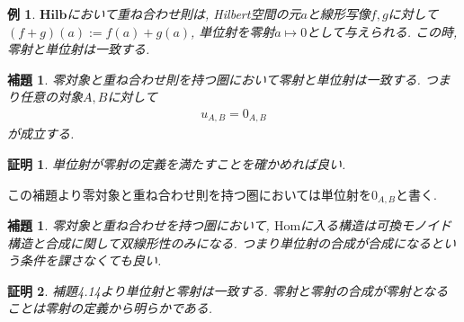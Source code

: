 \documentclass[a4paper,12pt]{ltjsarticle}
\theoremstyle{break}
\newtheorem{lem}[thm]{補題}
\newtheorem{eg}[thm]{例}
\newtheorem*{prf}{証明}
\newcommand{\hilb}{\mathbf{Hilb}}
\newcommand{\Hom}{\mathrm{Hom}}
\newcommand{\mt}{\mapsto}
\numberwithin{equation}{section}
\begin{document}
\begin{eg}
  $\hilb$において重ね合わせ則は, Hilbert空間の元$a$と線形写像$f,g$に対して$(f+g)(a):=f(a)+g(a)$, 単位射を零射$a \mt 0$として与えられる.  
  この時, 零射と単位射は一致する. 
\end{eg}  


\begin{lem}
  零対象と重ね合わせ則を持つ圏において零射と単位射は一致する. 
  つまり任意の対象$A,B$に対して
  \begin{align*}
    u_{A,B}=0_{A,B}
  \end{align*}
  が成立する. 
\end{lem}

\begin{prf}
  単位射が零射の定義を満たすことを確かめれば良い. 
\end{prf}

この補題より零対象と重ね合わせ則を持つ圏においては単位射を$0_{A,B}$と書く. 

\begin{lem}
  零対象と重ね合わせを持つ圏において, $\Hom$に入る構造は可換モノイド構造と合成に関して双線形性のみになる. 
  つまり単位射の合成が合成になるという条件を課さなくても良い. 
\end{lem}  

\begin{prf}
  補題4.14より単位射と零射は一致する. 
  零射と零射の合成が零射となることは零射の定義から明らかである. 
\end{prf}
\end{document}
